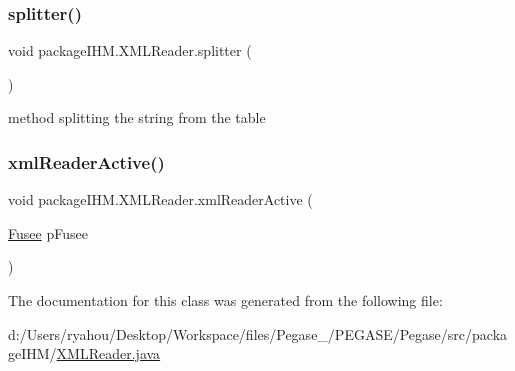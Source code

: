 \mbox{\label{classpackage_i_h_m_1_1_x_m_l_reader_a08e6efd00cdf8f85131c9e7aceaebea7}} 
\subsubsection{\texorpdfstring{splitter()}{splitter()}}
{\footnotesize\ttfamily void package\+I\+H\+M.\+X\+M\+L\+Reader.\+splitter (\begin{DoxyParamCaption}{ }\end{DoxyParamCaption})}

method splitting the string from the table \mbox{\label{classpackage_i_h_m_1_1_x_m_l_reader_a4969a78a69e9f65472e7dfc40689baac}} 
\subsubsection{\texorpdfstring{xml\+Reader\+Active()}{xmlReaderActive()}}
{\footnotesize\ttfamily void package\+I\+H\+M.\+X\+M\+L\+Reader.\+xml\+Reader\+Active (\begin{DoxyParamCaption}\item[{\mbox{\hyperlink{classpackage_i_h_m_1_1_fusee}{Fusee}}}]{p\+Fusee }\end{DoxyParamCaption})}



The documentation for this class was generated from the following file\+:\begin{DoxyCompactItemize}
\item 
d\+:/\+Users/ryahou/\+Desktop/\+Workspace/files/\+Pegase\+\_/\+P\+E\+G\+A\+S\+E/\+Pegase/src/package\+I\+H\+M/\mbox{\hyperlink{_x_m_l_reader_8java}{X\+M\+L\+Reader.\+java}}\end{DoxyCompactItemize}
